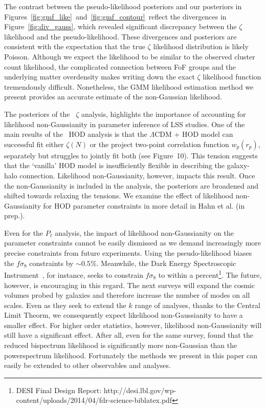 \documentclass[12pt, letterpaper, preprint]{aastex}
\newcommand{\Sinh}{\citetalias{sinha2017a}}
\begin{document}
The contrast between the pseudo-likelihood posteriors and our posteriors
in Figures~\ref{fig:gmf_like}~and~\ref{fig:gmf_contour}~reflect 
the divergences in Figure~\ref{fig:div_gauss}, which revealed significant
discrepancy between the $\zeta$ likelihood and the pseudo-likelihood. 
These divergences and posteriors are consistent with the expectation 
that the true $\zeta$ likelihood distribution is likely Poisson. Although 
we expect the likelihood to be similar to the observed cluster count likelihood, 
the complicated connection between FoF groups and the underlying 
matter overdensity makes writing down the exact $\zeta$ likelihood function 
tremendously difficult. Nonetheless, the GMM likelihood estimation method we 
present provides an accurate estimate of the non-Gaussian likelihood. 

The posteriors of the \Sinh~$\zeta$ analysis, highlights the importance of 
accounting for likelihood non-Gaussianity in parameter inference of 
LSS studies. One of the main results of the \Sinh~HOD analysis 
is that the $\Lambda$CDM + HOD model can successful 
fit either $\zeta(N)$ or the project two-point correlation function 
$w_p(r_p)$, separately but struggles to jointly fit both (see Figure~10). 
This tension suggests that the `vanilla' HOD model is insufficiently 
flexible in describing the galaxy-halo connection. Likelihood non-Gaussianity,
however, impacts this result. Once the non-Gaussianity is included in 
the analysis, the posteriors are broadened and shifted towards 
relaxing the tensions. We examine the effect of likelihood non-Gaussianity 
for HOD parameter constraints in more detail in Hahn et al. (in prep.). 

Even for the $P_\ell$ analysis, the impact of likelihood non-Gaussianity 
on the parameter constraints cannot be easily dismissed as we demand 
increasingly more precise constraints from future experiments. Using the 
pseudo-likelihood biases the $f\sigma_8$ constraints by $\sim 0.5\%$. 
Meanwhile, the Dark Energy Spectroscopic Instrument~\citep[DESI;][]{levi2013}, 
for instance, seeks to constrain $f\sigma_8$ to within a 
percent\footnote{DESI Final Design Report: http://desi.lbl.gov/wp-content/uploads/2014/04/fdr-science-biblatex.pdf}. 
The future, however, is encouraging in this regard.  The next surveys 
will expand the cosmic volumes probed by galaxies and therefore increase 
the number of modes on all scales. Even as they seek to extend the $k$ 
range of analyses, thanks to the Central Limit Theorm, we consequently expect 
likelihood non-Gaussianity to have a smaller effect. For higher order statistics, 
however, likelihood non-Gaussianity will still have a significant effect. After 
all, even for the same survey, \cite{scoccimarro2000} found that the reduced 
bispectrum likelihood is significantly more non-Gaussian than the powerspectrum 
likelihood.  
Fortunately the methods we present in this paper can easily be extended to other 
observables and analyses. 
\end{document}
